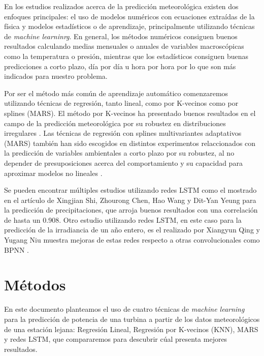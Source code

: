 \documentclass[journal]{IEEEtran}
\begin{document}
En los estudios realizados acerca de la predicción meteorológica existen dos enfoques principales: el uso de modelos numéricos con ecuaciones extraídas de la física y modelos estadísticos o de aprendizaje, principalmente utilizando técnicas de \emph{machine learninrg}. \cite{FOLEY20121} En general, los métodos numéricos consiguen buenos resultados calculando medias mensuales o anuales de variables macroscópicas como la temperatura o presión, mientras que los estadísticos consiguen buenas predicciones a corto plazo, día por día u hora por hora \cite{FOLEY20121} \cite{GIEBEL2003} por lo que son más indicados para nuestro problema.

Por ser el método más común de aprendizaje automático comenzaremos utilizando técnicas de regresión, tanto lineal, como por K-vecinos como por splines (MARS). El método por K-vecinos ha presentado buenos resultados en el campo de la predicción meteorológica por su robustez en distribuciones irregulares \cite{HUANG201789}. Las técnicas de regresión con splines multivariantes adaptativos (MARS) también han sido escogidos en distintos experimentos relaccionados con la predicción de variables ambientales a corto plazo por su robustez, al no depender de presuposiciones acerca del comportamiento y su capacidad para aproximar modelos no lineales \cite{KRZEMIEN2019777} \cite{PA_LEWIS1991_864}.

Se pueden encontrar múltiples estudios utilizando redes LSTM como el mostrado en el artículo de Xingjian Shi, Zhourong Chen, Hao Wang y Dit-Yan Yeung  para la predicción de precipitaciones\cite{NIPS2015_5955}, que arroja buenos resultados con una correlación de hasta un 0.908. Otro estudio utilizando redes LSTM, en este caso para la predicción de la irradiancia de un año entero, es el realizado por Xiangyun Qing y Yugang Niu muestra mejoras de estas redes respecto a otras convolucionales como BPNN \cite{QING2018461}.



\section{Métodos}
En este documento planteamos el uso de cuatro técnicas de \emph{machine learning} para la predicción de potencia de una turbina a partir de los datos meteorológicos de una estación lejana: Regresión Lineal, Regresión por K-vecinos (KNN), MARS y redes LSTM, que compararemos para descubrir cúal presenta mejores resultados.
\end{document}
